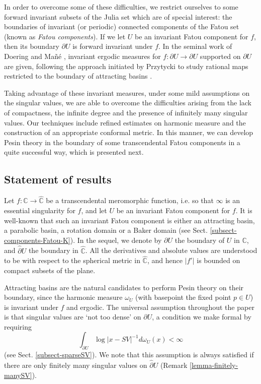 \documentclass[11pt]{article}
\theoremstyle{definition}
\theoremstyle{remark}
\newcounter{main}
\theoremstyle{plain}
\begin{document}
In order to overcome some of  these difficulties, we restrict ourselves to some forward invariant subsets of the Julia set which are of special interest: the boundaries of invariant (or periodic) connected components of the Fatou set (known as {\em Fatou components}). If we let $ U $ be an invariant Fatou component for $ f $, then its boundary $ \partial U$ is forward invariant under $ f $. In the seminal work of Doering and Mañé \cite{DoeringMane1991}, invariant ergodic measures for $ f\colon \partial U \to \partial U $ supported on $ \partial U $ are given, following the  approach initiated by Przytycki to study rational maps restricted to the boundary  of attracting basins  \cite{Przytycki-Hausdorff_dimension}.

Taking advantage of these invariant measures, under some mild assumptions on the singular values, we are able to overcome the difficulties arising from the lack of compactness, the infinite degree and the presence of infinitely many singular values. Our techniques include refined estimates on harmonic measure and the construction of an appropriate conformal metric.  In this manner, we can develop Pesin theory in the boundary of some transcendental Fatou components  in a quite successful way, which is presented next.
\subsection*{Statement of results}


Let $ f\colon \mathbb{C}\to\widehat{\mathbb{C}} $ be a transcendental meromorphic function, i.e. so that $ \infty $ is an essential singularity for $ f $, and let $ U $ be an invariant Fatou component for $ f $. It is well-known that such an invariant Fatou component is either an attracting basin, a parabolic basin, a rotation domain or a Baker domain (see Sect. \ref{subsect-components-Fatou-K}). In the sequel, we denote by $ \partial U $ the boundary of $ U $ in $ \mathbb{C} $, and $ \widehat{\partial} U $ the boundary  in $ \widehat{\mathbb{C}} $. All the derivatives and absolute values are understood to be with respect to the spherical metric in $ \widehat{\mathbb{C}} $, and hence $ \left| f'\right|  $ is bounded on compact subsets of the plane. 


Attracting basins are the natural candidates to perform Pesin theory on their boundary, since the harmonic measure $ \omega_U $ (with basepoint the fixed point $ p\in U $) is invariant under $ f $ and ergodic. The universal assumption throughout the paper is that singular values are `not too dense' on $ {\partial} U $, a condition we make formal by requiring $$ \int_{\partial U} \log\left| x-SV\right|^{-1} d\omega_U(x)<\infty  $$ (see Sect. \ref{subsect-sparseSV}). We note that this assumption is always satisfied if there are  only finitely many singular values on $ \widehat{\partial } U $ (Remark \ref{lemma-finitely-manySV}).
\end{document}
